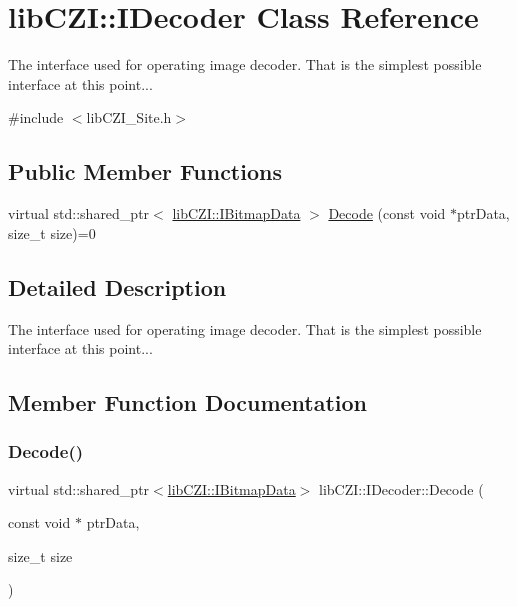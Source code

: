\hypertarget{classlib_c_z_i_1_1_i_decoder}{}\section{lib\+C\+ZI\+:\+:I\+Decoder Class Reference}
\label{classlib_c_z_i_1_1_i_decoder}


The interface used for operating image decoder. That is the simplest possible interface at this point...  




{\ttfamily \#include $<$lib\+C\+Z\+I\+\_\+\+Site.\+h$>$}

\subsection*{Public Member Functions}
\begin{DoxyCompactItemize}
\item 
virtual std\+::shared\+\_\+ptr$<$ \hyperlink{classlib_c_z_i_1_1_i_bitmap_data}{lib\+C\+Z\+I\+::\+I\+Bitmap\+Data} $>$ \hyperlink{classlib_c_z_i_1_1_i_decoder_a14733581cd1ba72bd39a156b98b52835}{Decode} (const void $\ast$ptr\+Data, size\+\_\+t size)=0
\end{DoxyCompactItemize}


\subsection{Detailed Description}
The interface used for operating image decoder. That is the simplest possible interface at this point... 

\subsection{Member Function Documentation}
\mbox{\label{classlib_c_z_i_1_1_i_decoder_a14733581cd1ba72bd39a156b98b52835}} 
\subsubsection{\texorpdfstring{Decode()}{Decode()}}
{\footnotesize\ttfamily virtual std\+::shared\+\_\+ptr$<$\hyperlink{classlib_c_z_i_1_1_i_bitmap_data}{lib\+C\+Z\+I\+::\+I\+Bitmap\+Data}$>$ lib\+C\+Z\+I\+::\+I\+Decoder\+::\+Decode (\begin{DoxyParamCaption}\item[{const void $\ast$}]{ptr\+Data,  }\item[{size\+\_\+t}]{size }\end{DoxyParamCaption})\hspace{0.3cm}{\ttfamily [pure virtual]}}

